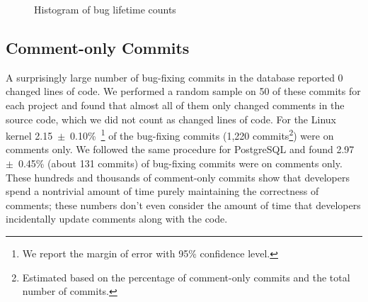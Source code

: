 \begin{figure}[tbh]
\centering
{}
\caption{\label{fig-bug-lifetime}Histogram of bug lifetime counts}
\end{figure}

\subsection{Comment-only Commits}
\label{sec-comment-only}

A surprisingly large number of bug-fixing commits in the database reported 0
changed lines of code. We performed a random sample on 50 of these commits for
each project and found that almost all of them only changed comments in the
source code, which we did not count as changed lines of code. For the Linux
kernel 2.15~$\pm$~0.10\%~\footnote{We report the margin of error with 95\%
  confidence level.}  of the bug-fixing commits (1,220
commits\footnote{Estimated based on the percentage of comment-only commits and
  the total number of commits.}) were on comments only. We followed the same
procedure for PostgreSQL and found 2.97~$\pm$~0.45\% (about 131 commits) of
bug-fixing commits were on comments only.  These hundreds and thousands of
comment-only commits show that developers spend a nontrivial amount of time
purely maintaining the correctness of comments; these numbers don't even
consider the amount of time that developers incidentally update comments along
with the code.

